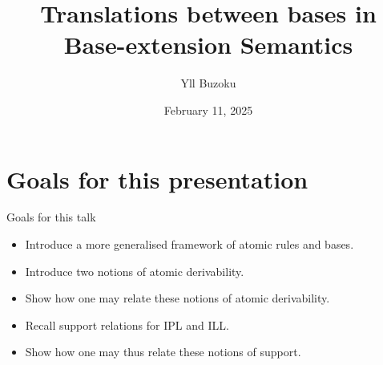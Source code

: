 \documentclass{beamer}
\title[Translations between bases in B-eS]{Translations between bases in Base-extension Semantics}
\author{Yll Buzoku}
\institute[UCL]{%
  Department of Computer Science \\ %
  University College London
}
\date{February 11, 2025}
\begin{document}
\begin{frame}
\titlepage
\end{frame}
\section*{Goals for this presentation}
\begin{frame}{Goals for this talk}
\begin{itemize}
\item Introduce a more generalised framework of atomic rules and bases.
\item Introduce two notions of atomic derivability.
\item Show how one may relate these notions of atomic derivability.
\item Recall support relations for IPL and ILL.
\item Show how one may thus relate these notions of support.
\end{itemize}
\end{frame}
\end{document}

